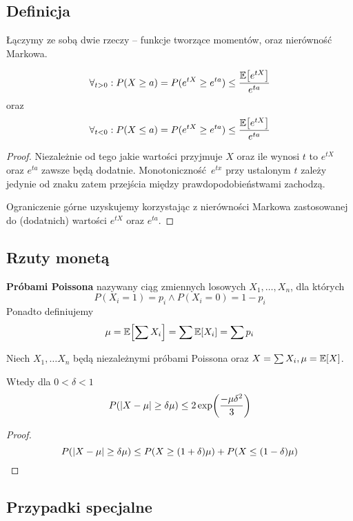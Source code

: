 \subsection{Definicja}
Łączymy ze sobą dwie rzeczy -- funkcje tworzące momentów, oraz nierówność Markowa.
\begin{theorem}
	\[
		\forall_{t > 0} : P(X \geq a) = P(e^{tX} \geq e^{ta}) \leq \frac{\expected{e^{tX}}}{e^{ta}}
	\]
	oraz
	\[
		\forall_{t < 0} : P(X \leq a) = P(e^{tX} \geq e^{ta}) \leq \frac{\expected{e^{tX}}}{e^{ta}}
	\]
\end{theorem}
\begin{proof}
	Niezależnie od tego jakie wartości przyjmuje \( X \) oraz ile wynosi \( t \) to \( e^{tX} \) oraz \( e^{ta} \) zawsze będą dodatnie.
	Monotoniczność \( e^{tx} \) przy ustalonym \( t \) zależy jedynie od znaku zatem przejścia między prawdopodobieństwami zachodzą.

	Ograniczenie górne uzyskujemy korzystając z nierówności Markowa zastosowanej do (dodatnich) wartości \( e^{tX} \) oraz \( e^{ta} \).
\end{proof}

\subsection{Rzuty monetą}

\begin{definition}
	\textbf{Próbami Poissona} nazywany ciąg zmiennych losowych \( X_1, \dots, X_n \), dla których
	\[
		P(X_i = 1) = p_i \land P(X_i = 0) = 1 - p_i
	\]
	Ponadto definiujemy
	\[
		\mu = \expected{\sum X_i} = \sum \expected{X_i} = \sum p_i
	\]
\end{definition}

\begin{lemma}
	\label{independent-poisson-trials-abs-bound}
	Niech \( X_1, \dots X_n \) będą niezależnymi próbami Poissona oraz \( X = \sum X_i, \mu = \expected{X} \).

	Wtedy dla \( 0 < \delta < 1 \)
	\[
		P(\abs{X - \mu} \geq \delta \mu) \leq 2 \exp\pars{\frac{-\mu\delta^2}{3}}
	\]
\end{lemma}
\begin{proof}
	\[
		P(\abs{X - \mu} \geq \delta\mu) \leq P\pars{X \geq (1 + \delta)\mu} + P\pars{X \leq (1 - \delta)\mu}
	\]
\end{proof}

\subsection{Przypadki specjalne}

